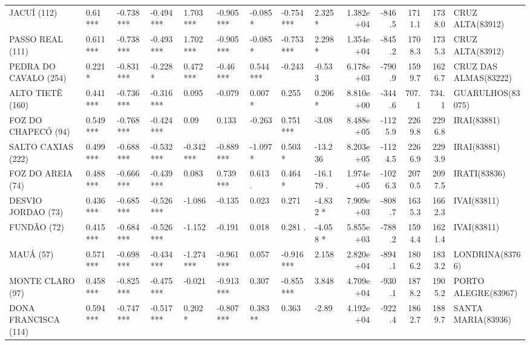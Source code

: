 \documentclass[12pt,oneside]{book}\usepackage[]{graphicx}\usepackage[]{color}
\newenvironment{knitrout}{}{} %
\theoremstyle{definition} %
\begin{document}
\begin{knitrout}
\begin{landscape}
\begin{table}
{\begin{tabular}[t]{lllllllllrrrrl}
JACUÍ (112) & 0.61 *** & -0.738 *** & -0.494 *** & 1.703 *** & -0.905 *** & -0.085 * & -0.754 *** & 2.325 * & 1.382e+04 & -846.5 & 1711.1 & 1738.0 & CRUZ ALTA(83912)\\
\rowcolor{gray!6}  PASSO REAL (111) & 0.611 *** & -0.738 *** & -0.493 *** & 1.702 *** & -0.905 *** & -0.085 * & -0.753 *** & 2.298 * & 1.354e+04 & -845.2 & 1708.3 & 1735.3 & CRUZ ALTA(83912)\\
PEDRA DO CAVALO (254) & 0.221 * & -0.831 *** & -0.228 * & 0.472 *** & -0.46 *** & 0.544 *** & -0.243 & -0.533 & 6.178e+03 & -790.9 & 1599.7 & 1626.7 & CRUZ DAS ALMAS(83222)\\
\rowcolor{gray!6}  ALTO TIETÊ (160) & 0.441 *** & -0.736 *** & -0.316 *** & 0.095 & -0.079 & 0.007 * & 0.255 & 0.206 * & 8.810e+00 & -344.6 & 707.1 & 734.1 & GUARULHOS(83075)\\
\addlinespace
FOZ DO CHAPECÓ (94) & 0.549 *** & -0.768 *** & -0.424 *** & 0.09 & 0.133 & -0.263 & 0.751 *** & -3.08 & 8.488e+05 & -1125.9 & 2269.8 & 2296.8 & IRAI(83881)\\
\rowcolor{gray!6}  SALTO CAXIAS (222) & 0.499 *** & -0.688 *** & -0.532 *** & -0.342 *** & -0.889 *** & -1.097 * & 0.503 * & -13.236 & 8.203e+05 & -1124.5 & 2266.9 & 2293.9 & IRAI(83881)\\
FOZ DO AREIA (74) & 0.488 *** & -0.666 *** & -0.439 *** & 0.083 & 0.739 *** & 0.613 . & 0.464 * & -16.179 . & 1.974e+05 & -1026.3 & 2070.5 & 2097.5 & IRATI(83836)\\
\rowcolor{gray!6}  DESVIO JORDAO (73) & 0.436 *** & -0.685 *** & -0.526 *** & -1.086 & -0.135 & 0.023 & 0.271 & -4.832 * & 7.909e+03 & -808.7 & 1635.3 & 1662.3 & IVAI(83811)\\
FUNDÃO (72) & 0.415 *** & -0.684 *** & -0.526 *** & -1.152 & -0.191 & 0.018 & 0.281 . & -4.058 * & 5.855e+03 & -788.2 & 1594.4 & 1621.4 & IVAI(83811)\\
\addlinespace
\rowcolor{gray!6}  MAUÁ (57) & 0.571 *** & -0.698 *** & -0.434 *** & -1.274 *** & -0.961 *** & 0.057 & -0.916 *** & 2.158 & 2.820e+04 & -894.1 & 1806.2 & 1833.2 & LONDRINA(83766)\\
MONTE CLARO (97) & 0.458 *** & -0.825 *** & -0.475 *** & -0.021 & -0.913 *** & 0.307 & -0.855 *** & 3.848 & 4.709e+04 & -930.1 & 1878.2 & 1905.2 & PORTO ALEGRE(83967)\\
\rowcolor{gray!6}  DONA FRANCISCA (114) & 0.594 *** & -0.747 *** & -0.517 *** & 0.202 * & -0.807 *** & 0.383 ** & 0.363 & -2.89 & 4.192e+04 & -922.4 & 1862.7 & 1889.7 & SANTA MARIA(83936)\\

\end{tabular}}
\end{table}
\end{landscape}
\end{knitrout}
\end{document}
